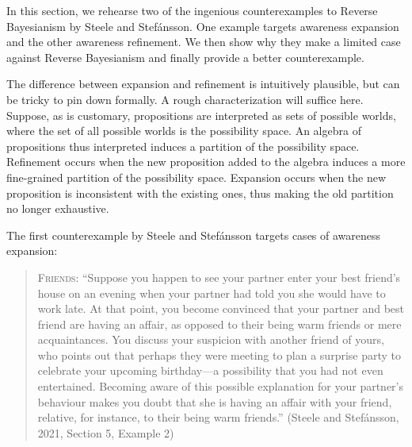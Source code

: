 \documentclass[
  11pt,
  dvipsnames,enabledeprecatedfontcommands]{scrartcl}
\begin{document}
\label{sec:counterexamples} \label{sec:better}

In this section, we rehearse two of the ingenious counterexamples to
Reverse Bayesianism by Steele and Stefánsson. One example targets
awareness expansion and the other awareness refinement. We then show why
they make a limited case against Reverse Bayesianism and finally provide
a better counterexample.

The difference between expansion and refinement is intuitively
plausible, but can be tricky to pin down formally. A rough
characterization will suffice here. Suppose, as is customary,
propositions are interpreted as sets of possible worlds, where the set
of all possible worlds is the possibility space. An algebra of
propositions thus interpreted induces a partition of the possibility
space. Refinement occurs when the new proposition added to the algebra
induces a more fine-grained partition of the possibility space.
Expansion occurs when the new proposition is inconsistent with the
existing ones, thus making the old partition no longer exhaustive.

The first counterexample by Steele and Stefánsson targets cases of
awareness expansion:

\begin{quote}
\textsc{Friends}: ``Suppose you happen to see your partner enter your
best friend's house on an evening when your partner had told you she
would have to work late. At that point, you become convinced that your
partner and best friend are having an affair, as opposed to their being
warm friends or mere acquaintances. You discuss your suspicion with
another friend of yours, who points out that perhaps they were meeting
to plan a surprise party to celebrate your upcoming birthday---a
possibility that you had not even entertained. Becoming aware of this
possible explanation for your partner's behaviour makes you doubt that
she is having an affair with your friend, relative, for instance, to
their being warm friends.'' (Steele and Stefánsson, 2021, Section 5,
Example 2)
\end{quote}
\end{document}
